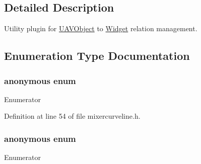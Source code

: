 \subsection{Detailed Description}
Utility plugin for \hyperlink{class_u_a_v_object}{U\-A\-V\-Object} to \hyperlink{class_widget}{Widget} relation management. 

\subsection{Enumeration Type Documentation}
\hypertarget{group___u_a_v_object_widget_utils_ga05d42f7e18658014a5ee7236f233e32d}{\subsubsection[{anonymous enum}]{\setlength{\rightskip}{0pt plus 5cm}anonymous enum}}\label{group___u_a_v_object_widget_utils_ga05d42f7e18658014a5ee7236f233e32d}
\begin{Desc}
\item[Enumerator]\par
\begin{description}
\item[{\em 
\hypertarget{group___u_a_v_object_widget_utils_gga05d42f7e18658014a5ee7236f233e32da59a3ef5ffd963601ffda52bb7bf42b3c}{Type}\label{group___u_a_v_object_widget_utils_gga05d42f7e18658014a5ee7236f233e32da59a3ef5ffd963601ffda52bb7bf42b3c}
}]\end{description}
\end{Desc}


Definition at line 54 of file mixercurveline.\-h.

\hypertarget{group___u_a_v_object_widget_utils_ga75c1a0485015845b058fbc969b688e5a}{\subsubsection[{anonymous enum}]{\setlength{\rightskip}{0pt plus 5cm}anonymous enum}}\label{group___u_a_v_object_widget_utils_ga75c1a0485015845b058fbc969b688e5a}
\begin{Desc}
\item[Enumerator]\par
\begin{description}
\item[{\em 
\hypertarget{group___u_a_v_object_widget_utils_gga75c1a0485015845b058fbc969b688e5aae34bb4f715b22e70e0a2182529bed883}{Type}\label{group___u_a_v_object_widget_utils_gga75c1a0485015845b058fbc969b688e5aae34bb4f715b22e70e0a2182529bed883}
}]\end{description}
\end{Desc}


